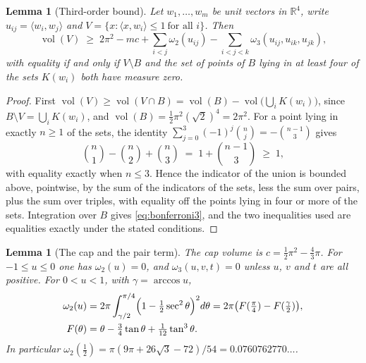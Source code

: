 \documentclass[11pt,reqno]{amsart}
\renewcommand{\_}{\origunderscore\allowbreak}
\numberwithin{equation}{section}
\theoremstyle{plain}
\newtheorem{lem}[thm]{Lemma}
\theoremstyle{definition}
\theoremstyle{remark}
\DeclareMathOperator{\vol}{vol}
\begin{document}
\begin{lem}[Third-order bound]\label{lem:bonferroni3}
Let $w_1,\dots,w_m$ be unit vectors in $\mathbb{R}^4$, write
$u_{ij}=\langle w_i,w_j\rangle$ and
$V=\{x:\langle x,w_i\rangle\le1\ \text{for all } i\}$. Then
\begin{equation}\label{eq:bonferroni3}
  \vol(V)\;\ge\;2\pi^2-mc+\sum_{i<j}\omega_2(u_{ij})
  -\sum_{i<j<k}\omega_3(u_{ij},u_{ik},u_{jk}),
\end{equation}
with equality if and only if $V\setminus B$ and the set of points of $B$
lying in at least four of the sets $K(w_i)$ both have measure zero.
\end{lem}

\begin{proof}
First $\vol(V)\ge\vol(V\cap B)=\vol(B)-\vol\bigl(\bigcup_iK(w_i)\bigr)$,
since $B\setminus V=\bigcup_iK(w_i)$, and $\vol(B)=\tfrac12\pi^2(\sqrt2)^4
=2\pi^2$. For a point lying in exactly $n\ge1$ of the sets, the identity
$\sum_{j=0}^{3}(-1)^j\binom nj=-\binom{n-1}{3}$ gives
\[
  \binom n1-\binom n2+\binom n3\;=\;1+\binom{n-1}3\;\ge\;1,
\]
with equality exactly when $n\le3$. Hence the indicator of the union is
bounded above, pointwise, by the sum of the indicators of the sets, less
the sum over pairs, plus the sum over triples, with equality off the
points lying in four or more of the sets. Integration over $B$ gives
\eqref{eq:bonferroni3}, and the two inequalities used are equalities
exactly under the stated conditions.
\end{proof}

\begin{lem}[The cap and the pair term]\label{lem:pair-volume}
The cap volume is $c=\tfrac12\pi^2-\tfrac43\pi$. For $-1\le u\le0$ one has
$\omega_2(u)=0$, and $\omega_3(u,v,t)=0$ unless $u$, $v$ and $t$ are all
positive. For $0<u<1$, with $\gamma=\arccos u$,
\begin{align}\label{eq:pair-volume}
  \omega_2(u)&=2\pi\int_{\gamma/2}^{\pi/4}\Bigl(1-\tfrac12\sec^2\theta\Bigr)^2d\theta
  =2\pi\bigl(F(\tfrac\pi4)-F(\tfrac\gamma2)\bigr),\\
  F(\theta)&=\theta-\tfrac34\tan\theta+\tfrac1{12}\tan^3\theta .\nonumber
\end{align}
In particular $\omega_2(\tfrac12)=\pi(9\pi+26\sqrt3-72)/54=0.0760762770\ldots$.
\end{lem}
\end{document}
